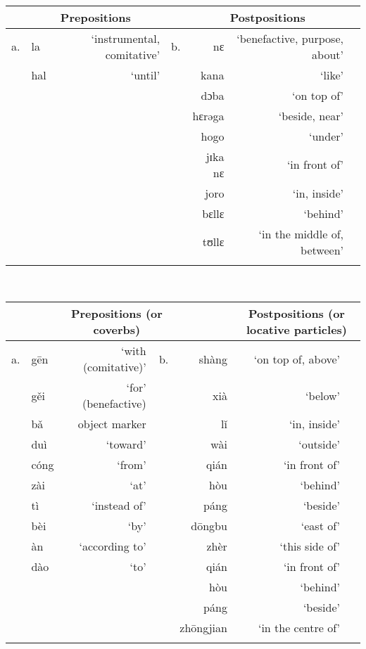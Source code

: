 \documentclass[output=paper]{langsci/langscibook}
\begin{document}
\begin{table}
\label{ex:dryer:}
\\

\begin{tabularx}{\textwidth}{Xlrrrrr} 
\lsptoprule
 & \multicolumn{2}{c}{\bfseries Prepositions} &  & \multicolumn{2}{c}{\bfseries Postpositions}\\
\midrule
a. & la & ‘instrumental, comitative’ & b. & nɛ & ‘benefactive, purpose, about’\\
 & hal & ‘until’ &  & kana & ‘like’\\
 &  &  &  & dɔba & ‘on top of’\\
 &  &  &  & hɛrəga & ‘beside, near’\\
 &  &  &  & hogo & ‘under’\\
 &  &  &  & jɪka nɛ & ‘in front of’\\
 &  &  &  & joro & ‘in, inside’\\
 &  &  &  & bɛllɛ & ‘behind’\\
 &  &  &  & tʊllɛ & ‘in the middle of, between’\\
\lspbottomrule
\end{tabularx}
\end{table}

\begin{table}
\label{ex:dryer:}
\\
\begin{tabularx}{\textwidth}{Xlrrrrr} 
\lsptoprule
&  & \multicolumn{2}{c}{\bfseries Prepositions (or coverbs)} &  & \multicolumn{2}{c}{\bfseries Postpositions (or locative particles)}\\
\midrule
a. & gēn & ‘with (comitative)’ & b. & shàng & ‘on top of, above’\\
 & gěi & ‘for’ (benefactive) &  & xià & ‘below’\\
 & bǎ & object marker &  & lǐ & ‘in, inside’\\
 & duì & ‘toward’ &  & wài & ‘outside’\\
 & cóng & ‘from’ &  & qián & ‘in front of’\\
 & zài & ‘at’ &  & hòu & ‘behind’\\
 & tì & ‘instead of’ &  & páng & ‘beside’\\
 & bèi & ‘by’ &  & dōngbu & ‘east of’\\
 & àn & ‘according to’ &  & zhèr & ‘this side of’\\
 & dào & ‘to’ &  & qián & ‘in front of’\\
 &  &  &  & hòu & ‘behind’\\
 &  &  &  & páng & ‘beside’\\
 &  &  &  & zhōngjian & ‘in the centre of’\\
\lspbottomrule
\end{tabularx}
\end{table}
\end{document}
